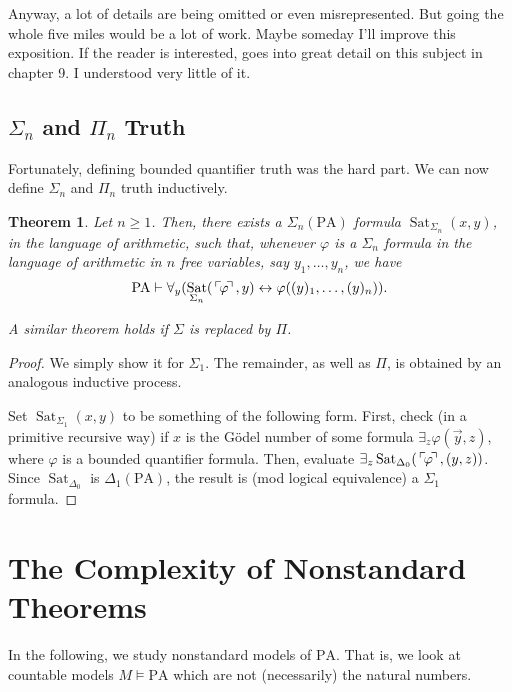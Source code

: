 \documentclass{article}
\newtheorem{theorem}{Theorem}[subsection]
\theoremstyle{nonumberplain}
\newtheorem{proof}{Proof}
\newcommand{\PA}{\mathrm{PA}}
\DeclareMathOperator{\Sat}{Sat}
\newcommand{\gn}[1]{\setbox0=\hbox{$\mathclap{\phantom{t}}#1$} \dimen0=\ht0 \advance\dimen0 by -1.25ex \,\raise\dimen0\hbox{$\ulcorner$} \! \box0 \! \raise\dimen0\hbox{$\urcorner$}\,}
\begin{document}
Anyway, a lot of details are being omitted or even misrepresented. But going the whole five miles would be a lot of work. Maybe someday I'll improve this exposition. If the reader is interested, \cite{kaye} goes into great detail on this subject in chapter 9. I understood very little of it.

\subsection{$\Sigma_n$ and $\Pi_n$ Truth}

Fortunately, defining bounded quantifier truth was the hard part. We can now define $\Sigma_n$ and $\Pi_n$ truth inductively.

\begin{theorem}\label{thm:satgeq1}
Let $n \geq 1$. Then, there exists a $\Sigma_n(\PA)$ formula $\Sat_{\Sigma_n}(x,y)$, in the language of arithmetic, such that, whenever $\varphi$ is a $\Sigma_n$ formula in the language of arithmetic in $n$ free variables, say $y_1, \dots, y_n$, we have
\begin{equation}\label{eq:satdelta0}
\PA \vdash \forall_y (\Sat_{\Sigma_n}(\gn{\varphi}, y) \leftrightarrow \varphi((y)_1, \dots, (y)_n)).
\end{equation}

A similar theorem holds if $\Sigma$ is replaced by $\Pi$.
\end{theorem}

\begin{proof}
We simply show it for $\Sigma_1$. The remainder, as well as $\Pi$, is obtained by an analogous inductive process.

Set $\Sat_{\Sigma_1}(x,y)$ to be something of the following form. First, check (in a primitive recursive way) if $x$ is the Gödel number of some formula $\exists_z \varphi(\vec y,z)$, where $\varphi$ is a bounded quantifier formula. Then, evaluate $\exists_z \Sat_{\Delta_0}(\gn\varphi, (y,z))$. Since $\Sat_{\Delta_0}$ is $\Delta_1(\PA)$, the result is (mod logical equivalence) a $\Sigma_1$ formula.
\end{proof}


\section{The Complexity of Nonstandard Theorems}\label{sec:nonstd}

In the following, we study nonstandard models of $\PA$. That is, we look at countable models $M \vDash \PA$ which are not (necessarily) the natural numbers.
\end{document}

